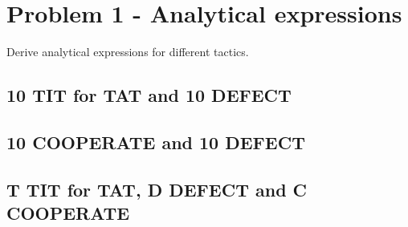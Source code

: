 \section{Problem 1 - Analytical expressions}
Derive analytical expressions for different tactics. 

\subsection{10 TIT for TAT and 10 DEFECT}


\subsection{10 COOPERATE and 10 DEFECT}


\subsection{T TIT for TAT, D DEFECT and C COOPERATE}